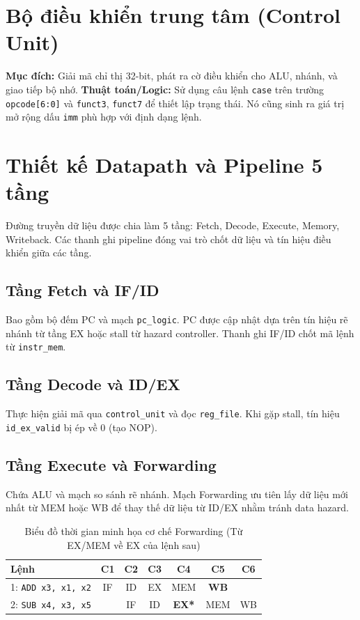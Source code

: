 \section{Bộ điều khiển trung tâm (Control Unit)}
\textbf{Mục đích:} Giải mã chỉ thị 32-bit, phát ra cờ điều khiển cho ALU, nhánh, và giao tiếp bộ nhớ.
\textbf{Thuật toán/Logic:} Sử dụng câu lệnh \texttt{case} trên trường \texttt{opcode[6:0]} và \texttt{funct3}, \texttt{funct7} để thiết lập trạng thái. Nó cũng sinh ra giá trị mở rộng dấu \texttt{imm} phù hợp với định dạng lệnh.

\section{Thiết kế Datapath và Pipeline 5 tầng}
Đường truyền dữ liệu được chia làm 5 tầng: Fetch, Decode, Execute, Memory, Writeback. Các thanh ghi pipeline đóng vai trò chốt dữ liệu và tín hiệu điều khiển giữa các tầng.

\subsection{Tầng Fetch và IF/ID}
Bao gồm bộ đếm PC và mạch \texttt{pc\_logic}. PC được cập nhật dựa trên tín hiệu rẽ nhánh từ tầng EX hoặc stall từ hazard controller. Thanh ghi IF/ID chốt mã lệnh từ \texttt{instr\_mem}.

\subsection{Tầng Decode và ID/EX}
Thực hiện giải mã qua \texttt{control\_unit} và đọc \texttt{reg\_file}. Khi gặp stall, tín hiệu \texttt{id\_ex\_valid} bị ép về 0 (tạo NOP).

\subsection{Tầng Execute và Forwarding}
Chứa ALU và mạch so sánh rẽ nhánh. Mạch Forwarding ưu tiên lấy dữ liệu mới nhất từ MEM hoặc WB để thay thế dữ liệu từ ID/EX nhằm tránh data hazard.

\begin{table}[H]
\centering
\begin{tabular}{|l|c|c|c|c|c|c|}
\hline
\textbf{Lệnh} & \textbf{C1} & \textbf{C2} & \textbf{C3} & \textbf{C4} & \textbf{C5} & \textbf{C6} \\
\hline
1: \texttt{ADD x3, x1, x2} & IF & ID & EX & MEM & \textbf{WB} & \\
\hline
2: \texttt{SUB x4, x3, x5} & & IF & ID & \textbf{EX*} & MEM & WB \\
\hline
\end{tabular}
\caption{Biểu đồ thời gian minh họa cơ chế Forwarding (Từ EX/MEM về EX của lệnh sau)}
\label{fig:forwarding_wave}
\end{table}

